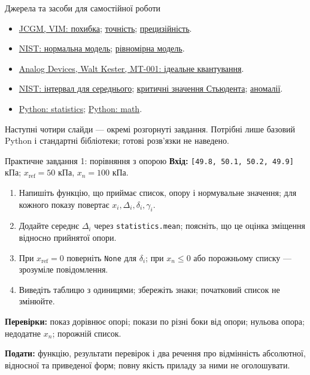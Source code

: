 \documentclass[aspectratio=169,11pt]{beamer}
\newcommand{\xref}{x_{\mathrm{ref}}}
\begin{document}
\begin{frame}{Джерела та засоби для самостійної роботи}
\small
\begin{itemize}
\item \href{https://jcgm.bipm.org/vim/en/2.16.html}{JCGM, VIM: похибка}; \href{https://jcgm.bipm.org/vim/en/2.13.html}{точність}; \href{https://jcgm.bipm.org/vim/en/2.15.html}{прецизійність}.
\item \href{https://www.itl.nist.gov/div898/handbook/eda/section3/eda3661.htm}{NIST: нормальна модель}; \href{https://www.itl.nist.gov/div898/handbook/eda/section3/eda3662.htm}{рівномірна модель}.
\item \href{https://www.analog.com/media/en/training-seminars/tutorials/MT-001.pdf}{Analog Devices, Walt Kester, MT-001: ідеальне квантування}.
\item \href{https://www.itl.nist.gov/div898/handbook/eda/section3/eda352.htm}{NIST: інтервал для середнього}; \href{https://www.itl.nist.gov/div898/handbook/eda/section3/eda3672.htm}{критичні значення Стьюдента}; \href{https://www.itl.nist.gov/div898/handbook/eda/section3/eda35h.htm}{аномалії}.
\item \href{https://docs.python.org/3/library/statistics.html}{Python: statistics}; \href{https://docs.python.org/3/library/math.html}{Python: math}.
\end{itemize}
Наступні чотири слайди — окремі розгорнуті завдання. Потрібні лише базовий Python і стандартні бібліотеки; готові розв'язки не наведено.
\end{frame}

\appendix
\begin{frame}{Практичне завдання 1: порівняння з опорою}
\small
\textbf{Вхід:} \texttt{[49.8, 50.1, 50.2, 49.9]} кПа; $\xref=50$ кПа, $x_n=100$ кПа.
\begin{enumerate}
\item Напишіть функцію, що приймає список, опору і нормувальне значення; для кожного показу повертає $x_i,\Delta_i,\delta_i,\gamma_i$.
\item Додайте середнє $\Delta_i$ через \texttt{statistics.mean}; поясніть, що це оцінка зміщення відносно прийнятої опори.
\item При $\xref=0$ поверніть \texttt{None} для $\delta_i$; при $x_n\le0$ або порожньому списку — зрозуміле повідомлення.
\item Виведіть таблицю з одиницями; збережіть знаки; початковий список не змінюйте.
\end{enumerate}
\textbf{Перевірки:} показ дорівнює опорі; покази по різні боки від опори; нульова опора; недодатне $x_n$; порожній список.
\medskip

\textbf{Подати:} функцію, результати перевірок і два речення про відмінність абсолютної, відносної та приведеної форм; повну якість приладу за ними не оголошувати.
\end{frame}
\end{document}
